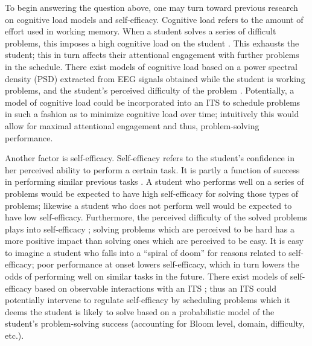 \documentclass[hidelinks,11pt]{article}
\begin{document}
To begin answering the question above, one may turn toward previous research on
cognitive load models and self-efficacy.  Cognitive load refers to the amount
of effort used in working memory. When a student solves a series of difficult
problems, this imposes a high cognitive load on the student {\citep{galan2012}}.
This exhausts the student; this in turn affects their attentional
engagement with further problems in the schedule.  There exist models of
cognitive load based on a power spectral density (PSD) extracted from EEG
signals obtained while the student is working problems, and the student's
perceived difficulty of the problem {\citep{galan2012}}.  Potentially, a model of
cognitive load could be incorporated into an ITS to schedule problems in such a
fashion as to minimize cognitive load over time; intuitively this would allow
for maximal attentional engagement and thus, problem-solving performance. 

Another factor is self-efficacy. Self-efficacy refers to the student's
confidence in her perceived ability to perform a certain task. It is partly a
function of success in performing similar previous tasks
{\citep{mcquiggan2007}}.  A student who performs well on a series of problems
would be expected to have high self-efficacy for solving those types of
problems; likewise a student who does not perform well would be expected to
have low self-efficacy. Furthermore, the perceived difficulty of the solved
problems plays into self-efficacy {\citep{mcquiggan2007, milner2014}}; solving
problems which are perceived to be hard has a more positive impact than solving
ones which are perceived to be easy. It is easy to imagine a student who falls
into a ``spiral of doom'' for reasons related to self-efficacy; poor
performance at onset lowers self-efficacy, which in turn lowers the odds of
performing well on similar tasks in the future.  There exist models of
self-efficacy based on observable interactions with an ITS
{\citep{mcquiggan2007}}; thus an ITS could potentially intervene to regulate
self-efficacy by scheduling problems which it deems the student is likely to
solve based on a probabilistic model of the student's problem-solving success
(accounting for Bloom level, domain, difficulty, etc.).
\end{document}
